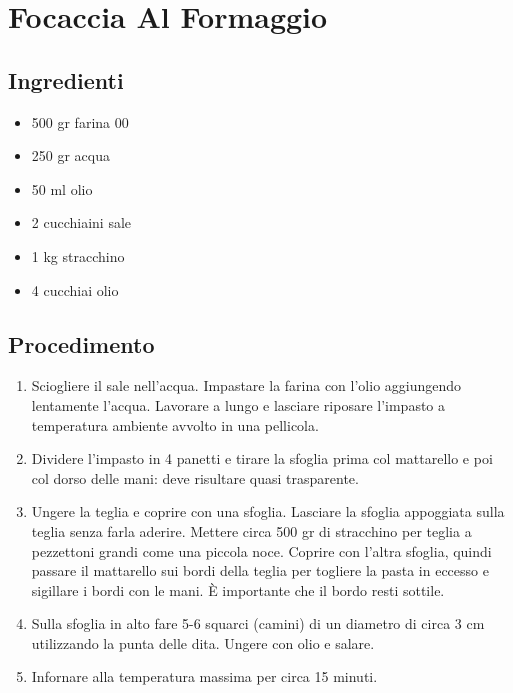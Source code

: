 \section{Focaccia Al Formaggio}
\subsection{Ingredienti}
\begin{itemize}
\item 500 gr farina 00  
\item 250 gr acqua  
\item 50 ml olio  
\item 2 cucchiaini sale  
\item 1 kg stracchino   
\item 4 cucchiai olio
\end{itemize}
\subsection{Procedimento}
\begin{enumerate}
\item  Sciogliere il sale nell'acqua. Impastare la farina con l'olio aggiungendo lentamente l'acqua. Lavorare a lungo e lasciare riposare l'impasto a temperatura ambiente avvolto in una pellicola.  
\item  Dividere l'impasto in 4 panetti e tirare la sfoglia prima col mattarello e poi col dorso delle mani: deve risultare quasi trasparente.  
\item  Ungere la teglia e coprire con una sfoglia. Lasciare la sfoglia appoggiata sulla teglia senza farla aderire. Mettere circa 500 gr di stracchino per teglia a pezzettoni grandi come una piccola noce. Coprire con l'altra sfoglia, quindi passare il mattarello sui bordi della teglia per togliere la pasta in eccesso e sigillare i bordi con le mani. È importante che il bordo resti sottile.  
\item  Sulla sfoglia in alto fare 5-6 squarci (camini) di un diametro di circa 3 cm utilizzando la punta delle dita. Ungere con olio e salare.  
\item  Infornare alla temperatura massima per circa 15 minuti.
\end{enumerate}
